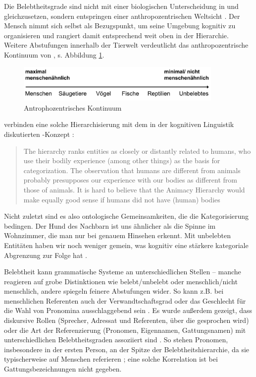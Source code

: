 Die Belebtheitsgrade sind nicht mit einer biologischen Unterscheidung in  und  gleichzusetzen, sondern entspringen einer anthropozentrischen Weltsicht \parencite[s.][]{Fraurud1996,Yamamoto1999,Enger2011}. Der Mensch nimmt sich selbst als Bezugspunkt, um seine Umgebung kognitiv zu organisieren und rangiert damit entsprechend weit oben in der Hierarchie. Weitere Abstufungen innerhalb der Tierwelt verdeutlicht das anthropozentrische Kontinuum von \textcite[114f.]{Kopcke2000}, s. Abbildung \ref{anthro}. 

\begin{figure}
\begin{center}
\includegraphics[width=10cm]{images/koepcke-anthro.jpg}
\caption {Antrophozentrisches Kontinuum \parencite[115]{Kopcke2000}}
\label{anthro}
\end{center}
\end{figure} 

 
\textcite{Enger2011} verbinden eine solche Hierarchisierung mit dem in der kognitiven Linguistik diskutierten -Konzept \parencite[vgl.][]{Lakoff1999}:
\blockcquote[208]{Enger2011}[.]{The hierarchy ranks entities as
closely or distantly related to humans, who use their bodily experience (among other things) as the basis for categorization. The observation that humans are different from animals probably presupposes our experience with our bodies as different from those of animals. It is hard to believe that the Animacy Hierarchy would make equally good sense if humans did not have (human) bodies} Nicht zuletzt sind es also ontologische Gemeinsamkeiten, die die Kategorisierung bedingen. Der Hund des Nachbarn ist uns ähnlicher als die Spinne im Wohnzimmer, die man nur bei genauem Hinsehen erkennt.
Mit unbelebten Entitäten haben wir noch weniger gemein, was kognitiv eine stärkere kategoriale Abgrenzung zur Folge hat  \parencite[vgl. auch][16]{Yamamoto1999}.

Belebtheit kann grammatische Systeme an unterschiedlichen Stellen  -- manche reagieren auf grobe Distinktionen wie belebt/unbelebt oder menschlich/nicht menschlich, andere spiegeln feinere Abstufungen wider. So kann z.B. bei menschlichen Referenten auch der Verwandtschaftsgrad oder das Geschlecht für die Wahl von Pronomina ausschlaggebend sein \parencite[s. ausführlich][194ff.]{Comrie1989, Corbett2000}. Es wurde außerdem gezeigt, dass diskursive Rollen (Sprecher,  Adressat und Referenten, über die gesprochen wird) oder die Art der Referenzierung (Pronomen, Eigennamen, Gattungsnamen)  mit unterschiedlichen Belebtheitsgraden assoziiert sind \parencite[s. etwa][186]{Comrie1989}. So stehen Pronomen, insbesondere in der ersten Person, an der Spitze der Belebtheitshierarchie,  da sie typischerweise auf Menschen referieren \parencite[s. auch][67]{Fraurud1996}; eine solche Korrelation ist bei Gattungsbezeichnungen nicht gegeben. 

